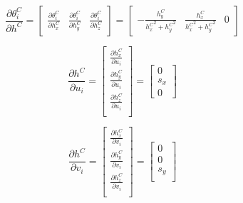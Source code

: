 \begin{equation}
\frac{\partial \theta_{i}^{C}}{\partial h^{C}}=\begin{bmatrix}
\frac{\partial \theta_{i}^{C}}{\partial h_{x}^{C}} & 
\frac{\partial \theta_{i}^{C}}{\partial h_{y}^{C}} & 
\frac{\partial \theta_{i}^{C}}{\partial h_{z}^{C}} \end{bmatrix}
=\begin{bmatrix}
-\frac{h_{y}^{C}}{{h_{x}^{C}}^{2}+{h_{y}^{C}}^{2}} & 
\frac{h_{x}^{C}}{{h_{x}^{C}}^{2}+{h_{y}^{C}}^{2}} & 0
\end{bmatrix}
\end{equation}

\begin{equation}
\frac{\partial h^{C}}{\partial u_{i}}=\begin{bmatrix}
\frac{\partial h_{x}^{C}}{\partial u_{i}} \\
\frac{\partial h_{y}^{C}}{\partial u_{i}} \\
\frac{\partial h_{z}^{C}}{\partial u_{i}} \\
\end{bmatrix}= \begin{bmatrix}
0 \\
s_{x}\\
0
\end{bmatrix}
\end{equation}

\begin{equation}
\frac{\partial h^{C}}{\partial v_{i}}=\begin{bmatrix}
\frac{\partial h_{x}^{C}}{\partial v_{i}}\\
\frac{\partial h_{y}^{C}}{\partial v_{i}}\\
\frac{\partial h_{z}^{C}}{\partial v_{i}}\\
\end{bmatrix}= \begin{bmatrix}
0 \\
0 \\
s_{y}\\
\end{bmatrix}
\end{equation}
